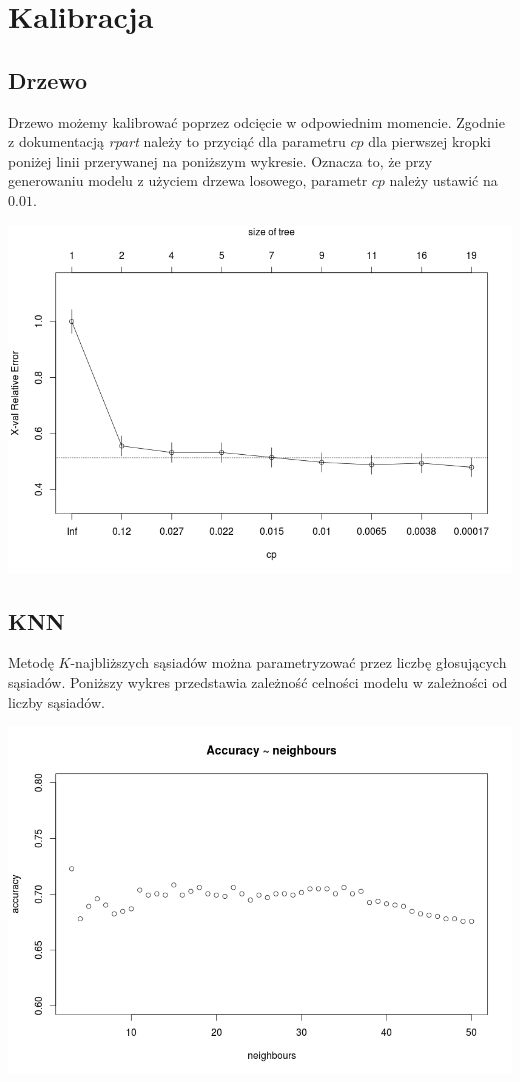 \documentclass{article}
\begin{document}
\section{Kalibracja}
\subsection{Drzewo}
Drzewo możemy kalibrować poprzez odcięcie w odpowiednim momencie. Zgodnie z dokumentacją {\itshape rpart} należy to przyciąć dla parametru $cp$
dla pierwszej kropki poniżej linii przerywanej na poniższym wykresie. Oznacza to, że przy generowaniu modelu z użyciem drzewa losowego, parametr $cp$ należy ustawić na $0.01$.

\begin{center}
	\includegraphics[scale=0.40]{images/przycinanie.png}
\end{center}

\subsection{KNN}
\label{knncalib}
Metodę $K$-najbliższych sąsiadów można parametryzować przez liczbę głosujących sąsiadów. Poniższy wykres przedstawia zależność celności modelu w zależności od liczby sąsiadów.

\begin{center}
	\includegraphics[scale=0.40]{images/accuracy-neighbours50.png}
\end{center}
\end{document}
